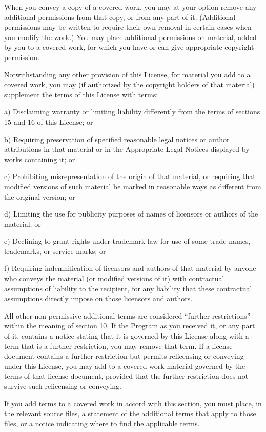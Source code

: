 \documentclass[letterpaper,10pt,english]{sphinxmanual}
\begin{document}
When you convey a copy of a covered work, you may at your option
remove any additional permissions from that copy, or from any part of
it.  (Additional permissions may be written to require their own
removal in certain cases when you modify the work.)  You may place
additional permissions on material, added by you to a covered work,
for which you have or can give appropriate copyright permission.

Notwithstanding any other provision of this License, for material you
add to a covered work, you may (if authorized by the copyright holders of
that material) supplement the terms of this License with terms:

a) Disclaiming warranty or limiting liability differently from the
terms of sections 15 and 16 of this License; or

b) Requiring preservation of specified reasonable legal notices or
author attributions in that material or in the Appropriate Legal
Notices displayed by works containing it; or

c) Prohibiting misrepresentation of the origin of that material, or
requiring that modified versions of such material be marked in
reasonable ways as different from the original version; or

d) Limiting the use for publicity purposes of names of licensors or
authors of the material; or

e) Declining to grant rights under trademark law for use of some
trade names, trademarks, or service marks; or

f) Requiring indemnification of licensors and authors of that
material by anyone who conveys the material (or modified versions of
it) with contractual assumptions of liability to the recipient, for
any liability that these contractual assumptions directly impose on
those licensors and authors.

All other non-permissive additional terms are considered “further
restrictions” within the meaning of section 10.  If the Program as you
received it, or any part of it, contains a notice stating that it is
governed by this License along with a term that is a further
restriction, you may remove that term.  If a license document contains
a further restriction but permits relicensing or conveying under this
License, you may add to a covered work material governed by the terms
of that license document, provided that the further restriction does
not survive such relicensing or conveying.

If you add terms to a covered work in accord with this section, you
must place, in the relevant source files, a statement of the
additional terms that apply to those files, or a notice indicating
where to find the applicable terms.
\end{document}
